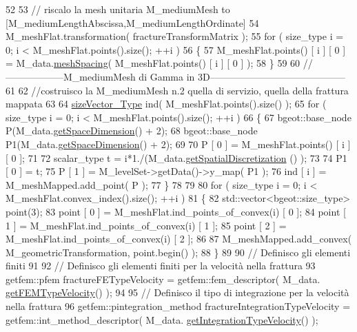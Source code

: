 \begin{DoxyCode}
52 
53     \textcolor{comment}{// riscalo la mesh unitaria M\_mediumMesh to [M\_mediumLengthAbscissa,M\_mediumLengthOrdinate]}
54     M\_meshFlat.transformation( fractureTransformMatrix );
55     \textcolor{keywordflow}{for} ( size\_type i = 0; i < M\_meshFlat.points().size(); ++i )
56     \{
57         M\_meshFlat.points() [ i ] [ 0 ] = M\_data.\hyperlink{classFractureData_ab79d66dd830b6e1c55ade0d940c5c8cf}{meshSpacing}( M\_meshFlat.points() [ i ] [ 0 ] );
58     \}
59     
60     \textcolor{comment}{//------------------M\_mediumMesh di Gamma in 3D------------------------------------------}
61 
62     \textcolor{comment}{//costruisco la M\_mediumMesh n.2 quella di servizio, quella della frattura mappata}
63 
64     \hyperlink{Core_8h_a83c51913d041a5001e8683434c09857f}{sizeVector\_Type} ind( M\_meshFlat.points().size() );
65     \textcolor{keywordflow}{for} ( size\_type i = 0; i < M\_meshFlat.points().size(); ++i )
66     \{
67         bgeot::base\_node P(M\_data.\hyperlink{classFractureData_a4ead03266295fe14fa3285692f945d89}{getSpaceDimension}() + 2);
68         bgeot::base\_node P1(M\_data.\hyperlink{classFractureData_a4ead03266295fe14fa3285692f945d89}{getSpaceDimension}() + 2);
69         
70         P [ 0 ] = M\_meshFlat.points() [ i ] [ 0 ];
71 
72         scalar\_type t = i*1./(M\_data.\hyperlink{classFractureData_a5c10d579be7849be1a126c24982f8a23}{getSpatialDiscretization} () );
73 
74         P1 [ 0 ] = t;
75         P [ 1 ] =  M\_levelSet->getData()->y\_map( P1 );
76         ind [ i ] = M\_meshMapped.add\_point( P );
77     \}
78 
79 
80     \textcolor{keywordflow}{for} ( size\_type i = 0; i < M\_meshFlat.convex\_index().size(); ++i )
81     \{
82         std::vector<bgeot::size\_type> point(3);
83         point [ 0 ] = M\_meshFlat.ind\_points\_of\_convex(i) [ 0 ];
84         point [ 1 ] = M\_meshFlat.ind\_points\_of\_convex(i) [ 1 ];
85         point [ 2 ] = M\_meshFlat.ind\_points\_of\_convex(i) [ 2 ];
86 
87         M\_meshMapped.add\_convex( M\_geometricTransformation, point.begin() );
88     \}
89 
90     \textcolor{comment}{// Definisco gli elementi finiti}
91 
92     \textcolor{comment}{// Definisco gli elementi finiti per la velocità nella frattura}
93     getfem::pfem fractureFETypeVelocity = getfem::fem\_descriptor( M\_data.
      \hyperlink{classFractureData_a7396b67399a1ae8e5550841907c0dcb5}{getFEMTypeVelocity}() );
94 
95     \textcolor{comment}{// Definisco il tipo di integrazione per la velocità nella frattura}
96     getfem::pintegration\_method fractureIntegrationTypeVelocity = getfem::int\_method\_descriptor( M\_data.
      \hyperlink{classFractureData_a8a8a198482de6bf4104746bc1d0510c6}{getIntegrationTypeVelocity}() );

\end{DoxyCode}
